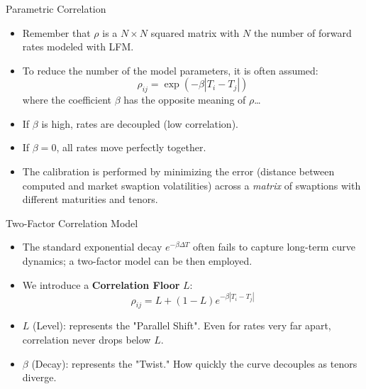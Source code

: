 \documentclass{beamer}
\begin{document}
\begin{frame}{Parametric Correlation}
	\begin{itemize}
		\item Remember that $\rho$ is a $N\times N$ squared matrix with $N$ the number of forward rates modeled with LFM.
		\item To reduce the number of the model parameters, it is often assumed:
		\begin{equation*}
			\rho_{ij} = \exp(-\beta |T_i - T_j|)
		\end{equation*}
		where the coefficient $\beta$ has the opposite meaning of $\rho$\ldots
		\item If $\beta$ is high, rates are decoupled (low correlation).
		\item If $\beta = 0$, all rates move perfectly together.
		\item The calibration is performed by minimizing the error (distance between computed and market swaption volatilities) across a \textit{matrix} of swaptions with different maturities and tenors.
	\end{itemize}
\end{frame}

\begin{frame}{Two-Factor Correlation Model}
	\begin{itemize}
		\item The standard exponential decay $e^{-\beta \Delta T}$ often fails to capture long-term curve dynamics; a two-factor model can be then employed.
		\item We introduce a \textbf{Correlation Floor} $L$:
		\begin{equation*}
			\rho_{ij} = L + (1 - L)e^{-\beta |T_i - T_j|}
		\end{equation*}
		\item $L$ (Level): represents the "Parallel Shift". Even for rates very far apart, correlation never drops below $L$.
		\item $\beta$ (Decay): represents the "Twist." How quickly the curve decouples as tenors diverge.
	\end{itemize}
\end{frame}
\end{document}
